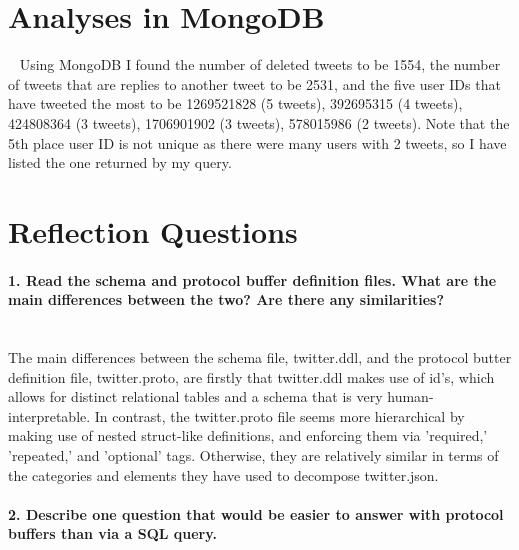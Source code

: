 \documentclass[12pt]{article}
\let\oldsection\section
\renewcommand\section{\clearpage\oldsection}
\begin{document}


\section{Analyses in MongoDB} ~
Using MongoDB I found the number of deleted tweets to be 1554, the number of tweets that are replies to another tweet to be 2531, and the five user IDs that have tweeted the most to be 1269521828 (5 tweets), 392695315 (4 tweets), 424808364 (3 tweets), 1706901902 (3 tweets), 578015986 (2 tweets). Note that the 5th place user ID is not unique as there were many users with 2 tweets, so I have listed the one returned by my query.



\section*{Reflection Questions}

\paragraph{1. Read the schema and protocol buffer definition files. What are the main differences between the two? Are there any similarities?}\mbox{}\\ 

The main differences between the schema file, twitter.ddl, and the protocol butter definition file, twitter.proto, are firstly that twitter.ddl makes use of id's, which allows for distinct relational tables and a schema that is very human-interpretable. In contrast, the twitter.proto file seems more hierarchical by making use of nested struct-like definitions, and enforcing them via 'required,' 'repeated,' and 'optional' tags. Otherwise, they are relatively similar in terms of the categories and elements they have used to decompose twitter.json.

\paragraph{2. Describe one question that would be easier to answer with protocol buffers than via a SQL query.}\mbox{}\\
\end{document}
